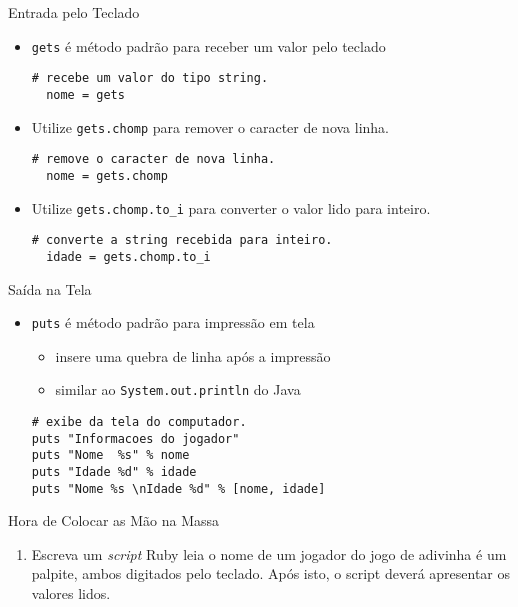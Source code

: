 \begin{frame}[fragile,t]{Entrada pelo Teclado}
    \begin{itemize}
      \item \verb!gets! é método \alert{padrão para receber} um valor pelo teclado 
          \begin{lstlisting}[style=RubyInputStyle]
  # recebe um valor do tipo string.
  nome = gets
        \end{lstlisting}
      \item Utilize \verb!gets.chomp! para remover o caracter de nova linha.
          \begin{lstlisting}[style=RubyInputStyle]
  # remove o caracter de nova linha.
  nome = gets.chomp
        \end{lstlisting}
        \item Utilize \verb!gets.chomp.to_i! para converter o valor lido para inteiro. 
          \begin{lstlisting}[style=RubyInputStyle]
  # converte a string recebida para inteiro.
  idade = gets.chomp.to_i
        \end{lstlisting}
    \end{itemize}   
  \end{frame}
\begin{frame}[fragile,t]{Saída na Tela}
    \begin{itemize}
      \item \verb!puts! é método \alert{padrão} para impressão em tela 
      \begin{itemize}
          \item insere uma quebra de linha após a impressão
          \item similar ao \verb!System.out.println! do Java
      \end{itemize}
      \begin{lstlisting}[style=RubyInputStyle]
# exibe da tela do computador.
puts "Informacoes do jogador"
puts "Nome  %s" % nome 
puts "Idade %d" % idade
puts "Nome %s \nIdade %d" % [nome, idade]
      \end{lstlisting}
    \end{itemize}   
  \end{frame}

\begin{frame}{Hora de Colocar as Mão na Massa}
  \begin{enumerate}
    \item Escreva um \textit{script} Ruby leia o nome de um jogador do jogo de adivinha é um 
    palpite, ambos digitados pelo teclado. Após isto, o script deverá apresentar os valores lidos.
  \end{enumerate}
  \framebreak
\end{frame}
  